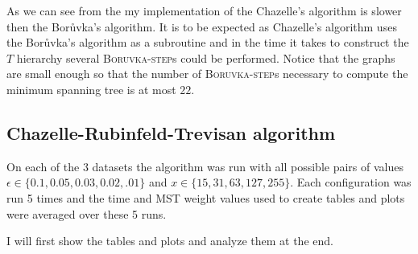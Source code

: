 As we can see from the  my implementation of the Chazelle's algorithm is slower then the Bor\r{u}vka's algorithm. It is to be expected as Chazelle's algorithm uses the Bor\r{u}vka's algorithm as a subroutine and in the time it takes to construct the $T$ hierarchy several \textsc{Boruvka-step}s could be performed. Notice that the graphs are small enough so that the number of \textsc{Boruvka-step}s necessary to compute the minimum spanning tree is at most $22$. 

\subsection{Chazelle-Rubinfeld-Trevisan algorithm}

On each of the $3$ datasets the algorithm was run with all possible pairs of values $\epsilon \in \{0.1, 0.05, 0.03, 0.02, .01\}$ and $x \in \{15, 31, 63,  127, 255\}$. Each configuration was run 5 times and the time and MST weight values used to create tables and plots were averaged over these 5 runs. 

I will first show the tables and plots and analyze them at the end.

